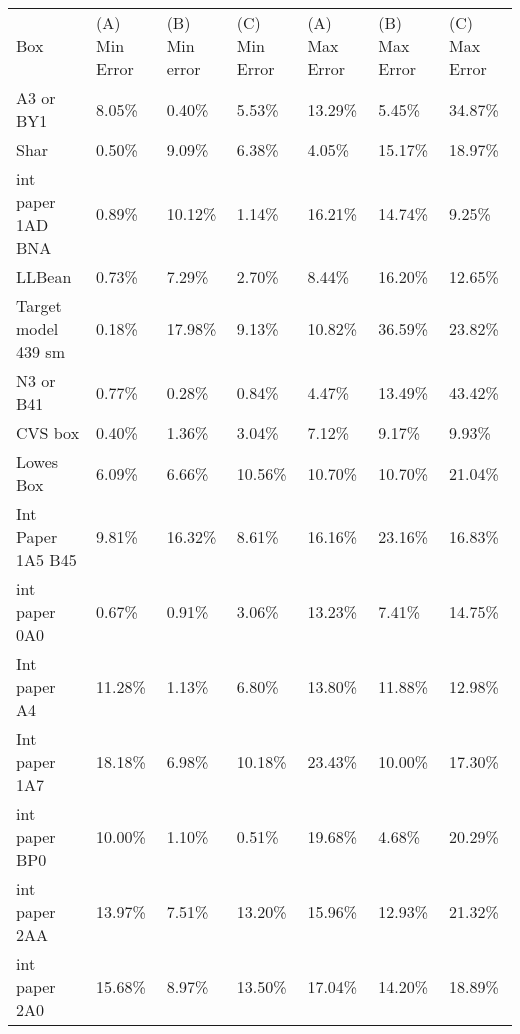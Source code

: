 \documentclass[11pt, twoside, reqno]{book}
\begin{document}
\begin{table}[]
	\label{AR2B}
	\tiny
	\begin{tabular}{lllllll}
		Box                 & (A) Min Error & (B) Min error & (C) Min Error & (A) Max Error & (B) Max Error & (C) Max Error \\
		A3 or BY1           & 8.05\%        & 0.40\%        & 5.53\%        & 13.29\%       & 5.45\%        & 34.87\%       \\
		Shar                & 0.50\%        & 9.09\%        & 6.38\%        & 4.05\%        & 15.17\%       & 18.97\%       \\
		int paper 1AD BNA   & 0.89\%        & 10.12\%       & 1.14\%        & 16.21\%       & 14.74\%       & 9.25\%        \\
		LLBean              & 0.73\%        & 7.29\%        & 2.70\%        & 8.44\%        & 16.20\%       & 12.65\%       \\
		Target model 439 sm & 0.18\%        & 17.98\%       & 9.13\%        & 10.82\%       & 36.59\%       & 23.82\%       \\
		N3 or B41           & 0.77\%        & 0.28\%        & 0.84\%        & 4.47\%        & 13.49\%       & 43.42\%       \\
		CVS box             & 0.40\%        & 1.36\%        & 3.04\%        & 7.12\%        & 9.17\%        & 9.93\%        \\
		Lowes Box           & 6.09\%        & 6.66\%        & 10.56\%       & 10.70\%       & 10.70\%       & 21.04\%       \\
		Int Paper 1A5 B45   & 9.81\%        & 16.32\%       & 8.61\%        & 16.16\%       & 23.16\%       & 16.83\%       \\
		int paper 0A0       & 0.67\%        & 0.91\%        & 3.06\%        & 13.23\%       & 7.41\%        & 14.75\%       \\
		Int paper A4        & 11.28\%       & 1.13\%        & 6.80\%        & 13.80\%       & 11.88\%       & 12.98\%       \\
		Int paper 1A7       & 18.18\%       & 6.98\%        & 10.18\%       & 23.43\%       & 10.00\%       & 17.30\%       \\
		int paper BP0       & 10.00\%       & 1.10\%        & 0.51\%        & 19.68\%       & 4.68\%        & 20.29\%       \\
		int paper 2AA       & 13.97\%       & 7.51\%        & 13.20\%       & 15.96\%       & 12.93\%       & 21.32\%       \\
		int paper 2A0       & 15.68\%       & 8.97\%        & 13.50\%       & 17.04\%       & 14.20\%       & 18.89\%       \\

\end{tabular}
\end{table}
\end{document}
